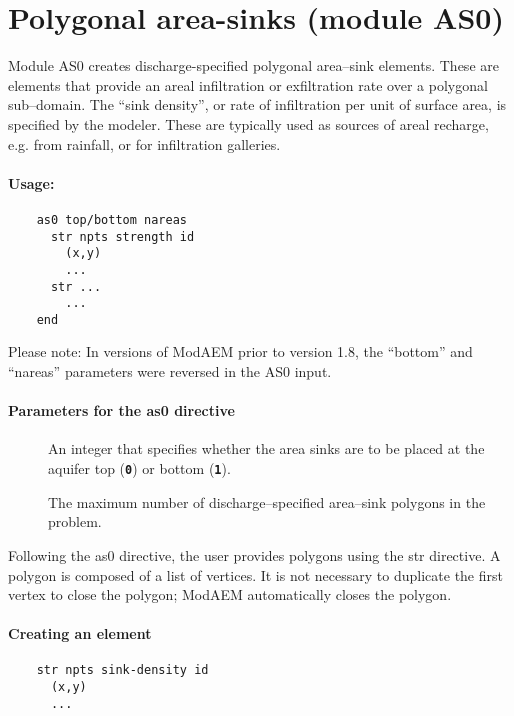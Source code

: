 \section{Polygonal area-sinks (module AS0)\label{sec:as0-module}}
Module AS0 creates discharge-specified polygonal area--sink elements. These
are elements that provide an areal infiltration or exfiltration rate
over a polygonal sub--domain. The ``sink density'', or rate of infiltration
per unit of surface area, is specified by the modeler. These are typically
used as sources of areal recharge, e.g. from rainfall, or for infiltration
galleries. 
\paragraph{Usage:}
\begin{verbatim}
    as0 top/bottom nareas
      str npts strength id
        (x,y) 
        ...
      str ...
        ...
    end
\end{verbatim}
Please note: In versions of ModAEM prior to version 1.8, the ``bottom''
and ``nareas'' parameters were reversed in the AS0 input.

\paragraph{Parameters for the \textsf{as0} directive}
\begin{description}
  \item [] An integer that specifies whether the area
    sinks are to be placed at the aquifer top (\texttt{\textbf{0}}) or
    bottom (\texttt{\textbf{1}}). \units{-}
  \item [] The maximum number of discharge--specified 
    area--sink polygons in the problem. \units{-}
\end{description}
Following the \textsf{as0} directive, the user provides polygons using
the \textsf{str} directive. A polygon is composed of a list of vertices.
It is not necessary to duplicate the first vertex to close the polygon;
ModAEM automatically closes the polygon.

\paragraph{Creating an element}
\begin{verbatim}
    str npts sink-density id
      (x,y) 
      ...
\end{verbatim}

